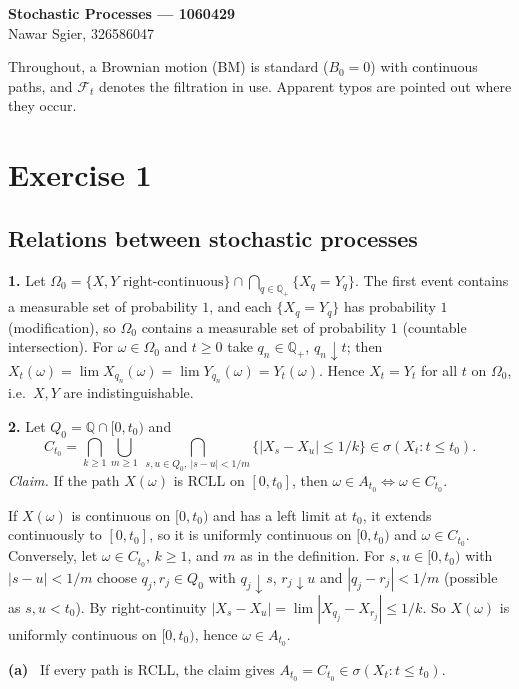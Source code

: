 \documentclass[11pt,a4paper]{article}
\newcommand{\Q}{\mathbb{Q}}
\newcommand{\F}{\mathcal{F}}
\newcommand{\1}{\mathbf{1}}
\newcommand{\prob}[1]{\par\medskip\noindent\textbf{#1}\quad}
\newcommand{\sub}[1]{\par\smallskip\noindent\textbf{#1}\ }
\begin{document}
\begin{center}
{\large\textbf{Stochastic Processes --- 1060429}}\\[2pt]
Nawar Sgier, 326586047
\end{center}

\noindent Throughout, a Brownian motion (BM) is standard ($B_0=0$) with continuous paths, and
$\F_t$ denotes the filtration in use. Apparent typos are pointed out where they occur.

\section*{Exercise 1}
\subsection*{Relations between stochastic processes}

\prob{1.}
Let $\Omega_0=\{X,Y\text{ right-continuous}\}\cap\bigcap_{q\in\Q_+}\{X_q=Y_q\}$. The first event
contains a measurable set of probability $1$, and each $\{X_q=Y_q\}$ has probability $1$
(modification), so $\Omega_0$ contains a measurable set of probability $1$ (countable
intersection). For $\omega\in\Omega_0$ and $t\ge0$ take $q_n\in\Q_+$, $q_n\downarrow t$; then
$X_t(\omega)=\lim X_{q_n}(\omega)=\lim Y_{q_n}(\omega)=Y_t(\omega)$. Hence $X_t=Y_t$ for all $t$ on
$\Omega_0$, i.e.\ $X,Y$ are indistinguishable.

\prob{2.}
Let $Q_0=\Q\cap[0,t_0)$ and
\[
 C_{t_0}=\bigcap_{k\ge1}\bigcup_{m\ge1}\ \bigcap_{s,u\in Q_0,\ |s-u|<1/m}\{|X_s-X_u|\le 1/k\}
 \in\sigma(X_t:t\le t_0).
\]
\textit{Claim.} If the path $X(\omega)$ is RCLL on $[0,t_0]$, then $\omega\in A_{t_0}\iff \omega\in C_{t_0}$.

If $X(\omega)$ is continuous on $[0,t_0)$ and has a left limit at $t_0$, it extends continuously to
$[0,t_0]$, so it is uniformly continuous on $[0,t_0)$ and $\omega\in C_{t_0}$. Conversely, let
$\omega\in C_{t_0}$, $k\ge1$, and $m$ as in the definition. For $s,u\in[0,t_0)$ with $|s-u|<1/m$
choose $q_j,r_j\in Q_0$ with $q_j\downarrow s$, $r_j\downarrow u$ and $|q_j-r_j|<1/m$ (possible as
$s,u<t_0$). By right-continuity $|X_s-X_u|=\lim|X_{q_j}-X_{r_j}|\le1/k$. So $X(\omega)$ is
uniformly continuous on $[0,t_0)$, hence $\omega\in A_{t_0}$.

\sub{(a)} If every path is RCLL, the claim gives $A_{t_0}=C_{t_0}\in\sigma(X_t:t\le t_0)$.
\end{document}
